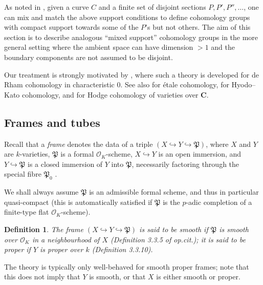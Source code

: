 \documentclass[cjm]{ipart}
\theoremstyle{plain}
\newtheorem{definition}[theorem]{Definition}
\theoremstyle{remark}
\newcommand{\CC}{\mathbf{C}}
\newcommand{\cO}{\mathcal{O}}
\newcommand{\fP}{\mathfrak{P}}
\newcommand{\into}{\hookrightarrow}
\numberwithin{equation}{subsection}
\begin{document}
  As noted in \cite{LSZ-asai}, given a curve $C$ and a finite set of disjoint sections $P, P', P'', \dots$, one can mix and match the above support conditions to define cohomology groups with compact support towards some of the $P$'s but not others. The aim of this section is to describe analogous ``mixed support'' cohomology groups in the more general setting where the ambient space can have dimension $> 1$ and the boundary components are not assumed to be disjoint.

  \begin{remark}
   Our treatment is strongly motivated by \cite[\S 4.2]{deligneillusie87}, where such a theory is developed for de Rham cohomology in characteristic 0. See also \cite[\S III]{faltings89} for \'etale cohomology, \cite[\S 2]{mieda09} for Hyodo--Kato cohomology, and \cite{browndupont} for Hodge cohomology of varieties over $\CC$.
  \end{remark}
 \subsection{Frames and tubes}

  Recall that a \emph{frame} denotes the data of a triple $(X \into Y \into \fP)$, where $X$ and $Y$ are $k$-varieties, $\fP$ is a formal $\cO_K$-scheme, $X \into Y$ is an open immersion, and $Y \into \fP$ is a closed immersion of $Y$ into $\fP$, necessarily factoring through the special fibre $\fP_0$ \cite[Definition 3.1.5]{lestum07}.

  \begin{note}
   We shall always assume $\fP$ is an admissible formal scheme, and thus in particular quasi-compact (this is automatically satisfied if $\fP$ is the $p$-adic completion of a finite-type flat $\cO_K$-scheme).
  \end{note}

   \begin{definition}
   The frame $(X \into Y \into \fP)$ is said to be \emph{smooth} if $\fP$ is smooth over $\cO_K$ in a neighbourhood of $X$ (Definition 3.3.5 of \emph{op.cit.}); it is said to be \emph{proper} if $Y$ is proper over $k$ (Definition 3.3.10).
  \end{definition}

  The theory is typically only well-behaved for smooth proper frames; note that this does not imply that $Y$ is smooth, or that $X$ is either smooth or proper.

\end{document}

